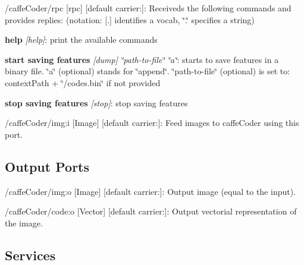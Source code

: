 \begin{DoxyItemize}
\item /caffe\+Coder/rpc \mbox{[}rpc\mbox{]} \mbox{[}default carrier\+:\mbox{]}\+: Receiveds the following commands and provides replies\+: (notation\+: \mbox{[}.\mbox{]} identifies a vocab, \char`\"{}.\char`\"{} specifies a string)
\begin{DoxyEnumerate}
\item {\bfseries help} {\itshape \mbox{[}help\mbox{]}}\+: print the available commands
\item {\bfseries start saving features} {\itshape \mbox{[}dump\mbox{]} \char`\"{}path-\/to-\/file\char`\"{} \char`\"{}a\char`\"{}}\+: starts to save features in a binary file. \char`\"{}a\char`\"{} (optional) stands for \char`\"{}append\char`\"{}. \char`\"{}path-\/to-\/file\char`\"{} (optional) is set to\+: context\+Path + \char`\"{}/codes.\+bin\char`\"{} if not provided
\item {\bfseries stop saving features} {\itshape \mbox{[}stop\mbox{]}}\+: stop saving features
\end{DoxyEnumerate}
\item /caffe\+Coder/img\+:i \mbox{[}Image\mbox{]} \mbox{[}default carrier\+:\mbox{]}\+: Feed images to caffe\+Coder using this port.
\end{DoxyItemize}\hypertarget{group__caffeCoder_outputports_sec}{}\subsection{Output Ports}\label{group__caffeCoder_outputports_sec}

\begin{DoxyItemize}
\item /caffe\+Coder/img\+:o \mbox{[}Image\mbox{]} \mbox{[}default carrier\+:\mbox{]}\+: Output image (equal to the input).
\item /caffe\+Coder/code\+:o \mbox{[}Vector\mbox{]} \mbox{[}default carrier\+:\mbox{]}\+: Output vectorial representation of the image.
\end{DoxyItemize}\hypertarget{group__caffeCoder_services_sec}{}\subsection{Services}\label{group__caffeCoder_services_sec}
